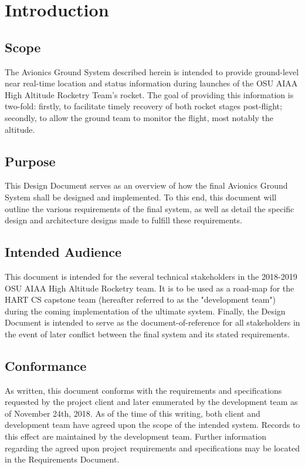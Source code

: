 \documentclass[journal,10pt,onecolumn,compsoc]{IEEEtran}
\begin{document}
\section{Introduction}

\subsection{Scope}
The Avionics Ground System described herein is intended to provide ground-level near real-time location and status information during launches of the OSU AIAA High Altitude Rocketry Team's rocket.
The goal of providing this information is two-fold: firstly, to facilitate timely recovery of both rocket stages post-flight; secondly, to allow the ground team to monitor the flight, most notably the altitude.

\subsection{Purpose}
This Design Document serves as an overview of how the final Avionics Ground System shall be designed and implemented.
To this end, this document will outline the various requirements of the final system, as well as detail the specific design and architecture designs made to fulfill these requirements.

\subsection{Intended Audience}
This document is intended for the several technical stakeholders in the 2018-2019 OSU AIAA High Altitude Rocketry team.
It is to be used as a road-map for the HART CS capstone team (hereafter referred to as the "development team") during the coming implementation of the ultimate system.
Finally, the Design Document is intended to serve as the document-of-reference for all stakeholders in the event of later conflict between the final system and its stated requirements.

\subsection{Conformance}
As written, this document conforms with the requirements and specifications requested by the project client and later enumerated by the development team as of November 24th, 2018.
As of the time of this writing, both client and development team have agreed upon the scope of the intended system.
Records to this effect are maintained by the development team.
Further information regarding the agreed upon project requirements and specifications may be located in the Requirements Document.
\end{document}
